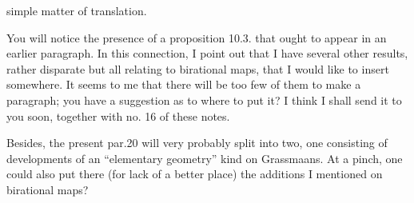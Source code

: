 
simple matter of translation.

You will notice the presence of a proposition 10.3. that ought to
appear in an earlier paragraph. In this connection, I point out that I have
several other results, rather disparate but all relating to
birational maps, that I would like to insert somewhere.
It seems to me that there will be too few of them to make a paragraph; 
you have a suggestion as to where to put it? I think I shall send it to you
soon, together with no. 16 of these notes.

Besides, the present par.20 will very probably split into
two, one consisting of developments of an ``elementary geometry''
kind on Grassmaans. At a pinch, one could also put there
(for lack of a better place) the additions I mentioned on
birational maps?


